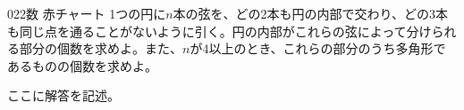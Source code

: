 \begin{prob}{022}{}{数 赤チャート}
 1つの円に$n$本の弦を、どの2本も円の内部で交わり、どの3本も同じ点を通ることがないように引く。円の内部がこれらの弦によって分けられる部分の個数を求めよ。また、$n$が4以上のとき、これらの部分のうち多角形であるものの個数を求めよ。
\end{prob}

ここに解答を記述。